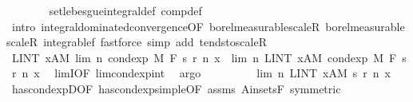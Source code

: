 \begin{isabellebody}
\ \ \ \ \ \ \isamarkupfalse%
\ set{\isacharunderscore}{\kern0pt}lebesgue{\isacharunderscore}{\kern0pt}integral{\isacharunderscore}{\kern0pt}def\ comp{\isacharunderscore}{\kern0pt}def\isanewline
\ \ \ \ \ \ \isamarkupfalse%
\ {\isacharparenleft}{\kern0pt}intro\ integral{\isacharunderscore}{\kern0pt}dominated{\isacharunderscore}{\kern0pt}convergence{\isacharbrackleft}{\kern0pt}OF\ borel{\isacharunderscore}{\kern0pt}measurable{\isacharunderscore}{\kern0pt}scaleR\ borel{\isacharunderscore}{\kern0pt}measurable{\isacharunderscore}{\kern0pt}scaleR\ integrable{\isacharunderscore}{\kern0pt}{}f{\isacharbrackright}{\kern0pt}{\isacharparenright}{\kern0pt}\ {\isacharparenleft}{\kern0pt}fastforce\ simp\ add{\isacharcolon}{\kern0pt}\ tendsto{\isacharunderscore}{\kern0pt}scaleR{\isacharparenright}{\kern0pt}{\isacharplus}{\kern0pt}\isanewline
\isanewline
\ \ \ \ \isamarkupfalse%
\ {\isachardoublequoteopen}LINT\ x{\isacharcolon}{\kern0pt}A{\isacharbar}{\kern0pt}M{\isachardot}{\kern0pt}\ lim\ {\isacharparenleft}{\kern0pt}{\isasymlambda}n{\isachardot}{\kern0pt}\ cond{\isacharunderscore}{\kern0pt}exp\ M\ F\ {\isacharparenleft}{\kern0pt}s\ {\isacharparenleft}{\kern0pt}r\ n{\isacharparenright}{\kern0pt}{\isacharparenright}{\kern0pt}\ x{\isacharparenright}{\kern0pt}\ {\isacharequal}{\kern0pt}\ lim\ {\isacharparenleft}{\kern0pt}{\isasymlambda}n{\isachardot}{\kern0pt}\ LINT\ x{\isacharcolon}{\kern0pt}A{\isacharbar}{\kern0pt}M{\isachardot}{\kern0pt}\ cond{\isacharunderscore}{\kern0pt}exp\ M\ F\ {\isacharparenleft}{\kern0pt}s\ {\isacharparenleft}{\kern0pt}r\ n{\isacharparenright}{\kern0pt}{\isacharparenright}{\kern0pt}\ x{\isacharparenright}{\kern0pt}{\isachardoublequoteclose}\ \isamarkupfalse%
\ limI{\isacharbrackleft}{\kern0pt}OF\ lim{\isacharunderscore}{\kern0pt}cond{\isacharunderscore}{\kern0pt}exp{\isacharunderscore}{\kern0pt}int{\isacharbrackright}{\kern0pt}\ \isamarkupfalse%
\ argo\isanewline
\ \ \ \ \isamarkupfalse%
\ \isamarkupfalse%
\ {\isachardoublequoteopen}{\isachardot}{\kern0pt}{\isachardot}{\kern0pt}{\isachardot}{\kern0pt}\ {\isacharequal}{\kern0pt}\ lim\ {\isacharparenleft}{\kern0pt}{\isasymlambda}n{\isachardot}{\kern0pt}\ LINT\ x{\isacharcolon}{\kern0pt}A{\isacharbar}{\kern0pt}M{\isachardot}{\kern0pt}\ s\ {\isacharparenleft}{\kern0pt}r\ n{\isacharparenright}{\kern0pt}\ x{\isacharparenright}{\kern0pt}{\isachardoublequoteclose}\ \isamarkupfalse%
\ has{\isacharunderscore}{\kern0pt}cond{\isacharunderscore}{\kern0pt}expD{\isacharparenleft}{\kern0pt}{}{\isacharparenright}{\kern0pt}{\isacharbrackleft}{\kern0pt}OF\ has{\isacharunderscore}{\kern0pt}cond{\isacharunderscore}{\kern0pt}exp{\isacharunderscore}{\kern0pt}simple{\isacharbrackleft}{\kern0pt}OF\ assms{\isacharparenleft}{\kern0pt}{}{\isacharcomma}{\kern0pt}{}{\isacharparenright}{\kern0pt}{\isacharbrackright}{\kern0pt}\ A{\isacharunderscore}{\kern0pt}in{\isacharunderscore}{\kern0pt}sets{\isacharunderscore}{\kern0pt}F{\isacharcomma}{\kern0pt}\ symmetric{\isacharbrackright}{\kern0pt}\ \isamarkupfalse%

\end{isabellebody}
